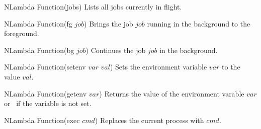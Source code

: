 \begin{defun}{NLambda Function}{(jobs)}
  Lists all jobs currently in flight.
\end{defun}

\begin{defun}{NLambda Function}{(fg $job$)}
  Brings the job $job$ running
  in the background to the foreground.
\end{defun}

\begin{defun}{NLambda Function}{(bg $job$)}
  Continues the job $job$ in the background.
\end{defun}

\begin{defun}{NLambda Function}{(setenv $var$ $val$)}
  Sets the environment variable $var$ to the value $val$.
\end{defun}

\begin{defun}{NLambda Function}{(getenv $var$)}
  Returns the value of the environment varable $var$ or \NIL\ if the
  variable is not set.
\end{defun}

\begin{defun}{NLambda Function}{(exec $cmd$)}
  Replaces the current process with $cmd$.
\end{defun}
